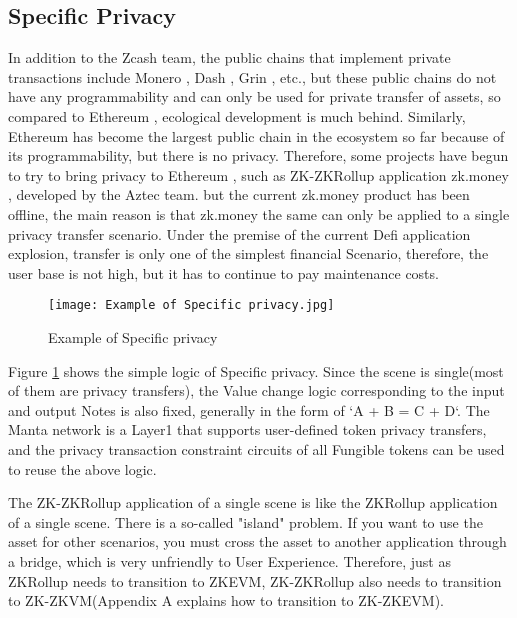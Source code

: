 \subsection{Specific Privacy}

In addition to the Zcash \cite{website:Zcash} team, the public chains that implement private transactions 
include Monero \cite{website:Monero}, Dash \cite{website:Dash}, Grin \cite{website:Grin}, etc., but these public chains do not have any 
programmability and can only be used for private transfer of assets, so compared to 
Ethereum \cite{website:Ethereum}, ecological development is much behind. Similarly, Ethereum \cite{website:Ethereum} has become 
the largest public chain in the ecosystem so far because of its programmability, 
but there is no privacy. Therefore, some projects have begun to try to bring privacy to 
Ethereum \cite{website:Ethereum}, such as ZK-ZKRollup application zk.money \cite{website:zk.money}, developed by the Aztec \cite{website:Aztec} team. 
but the current zk.money \cite{website:zk.money} product has been offline, the main reason is that zk.money \cite{website:zk.money}
the same can only be applied to a single privacy transfer scenario. Under the premise 
of the current Defi application explosion, transfer is only one of the simplest 
financial Scenario, therefore, the user base is not high, but it has to continue 
to pay maintenance costs.
\begin{figure}[!ht]
    \centering
    \texttt{[image: Example of Specific privacy.jpg]}
    \caption{Example of Specific privacy}
    \label{fig:Example of Specific privacy}
\end{figure}

Figure \ref{fig:Example of Specific privacy} shows the simple logic of Specific privacy. Since the scene is single(most of 
them are privacy transfers), the Value change logic corresponding to the input and output 
Notes is also fixed, generally in the form of `A + B = C + D`. The Manta network \cite{website:Manta-network} is a 
Layer1 that supports user-defined token privacy transfers, and the privacy transaction 
constraint circuits of all Fungible tokens can be used to reuse the above logic.

The ZK-ZKRollup application of a single scene is like the ZKRollup application of a 
single scene. There is a so-called "island" problem. If you want to use the asset for 
other scenarios, you must cross the asset to another application through a bridge, 
which is very unfriendly to User Experience. Therefore, just as ZKRollup needs to 
transition to ZKEVM, ZK-ZKRollup also needs to transition to ZK-ZKVM(Appendix A explains 
how to transition to ZK-ZKEVM).